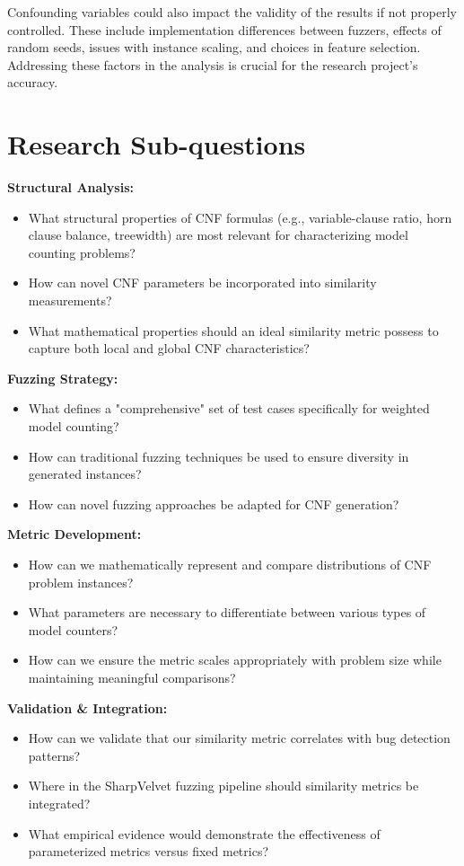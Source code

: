 \documentclass[english, a4paper]{article}
\begin{document}
Confounding variables could also impact the validity of the results if not properly controlled. These include implementation differences between fuzzers, effects of random seeds, issues with instance scaling, and choices in feature selection. Addressing these factors in the analysis is crucial for the research project's accuracy.

\section*{Research Sub-questions}

\textbf{Structural Analysis:}
\begin{itemize}
    \item What structural properties of CNF formulas (e.g., variable-clause ratio, horn clause balance, treewidth) are most relevant for characterizing model counting problems?
    \item How can novel CNF parameters be incorporated into similarity measurements?
    \item What mathematical properties should an ideal similarity metric possess to capture both local and global CNF characteristics?
\end{itemize}

\textbf{Fuzzing Strategy:}
\begin{itemize}
    \item What defines a "comprehensive" set of test cases specifically for weighted model counting?
    \item How can traditional fuzzing techniques be used to ensure diversity in generated instances?
    \item How can novel fuzzing approaches be adapted for CNF generation?
\end{itemize}

\textbf{Metric Development:}
\begin{itemize}
    \item How can we mathematically represent and compare distributions of CNF problem instances?
    \item What parameters are necessary to differentiate between various types of model counters?
    \item How can we ensure the metric scales appropriately with problem size while maintaining meaningful comparisons?
\end{itemize}

\textbf{Validation \& Integration:}
\begin{itemize}
    \item How can we validate that our similarity metric correlates with bug detection patterns?
    \item Where in the SharpVelvet fuzzing pipeline should similarity metrics be integrated?
    \item What empirical evidence would demonstrate the effectiveness of parameterized metrics versus fixed metrics?
\end{itemize}
\end{document}
